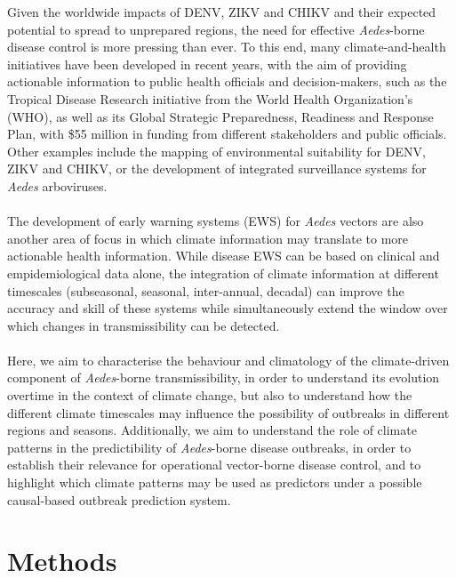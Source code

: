 \documentclass[10pt,twocolumn]{wlscirep}
\begin{document}
Given the worldwide impacts of DENV, ZIKV and CHIKV and their expected potential to spread to unprepared regions, the need for effective \textit{Aedes}-borne disease control is more pressing than ever. To this end, many climate-and-health initiatives have been developed in recent years, with the aim of providing actionable information to public health officials and decision-makers, such as the Tropical Disease Research initiative from the World Health Organization's (WHO)\cite{keating_2023, ramirez_2017}, as well as its Global Strategic Preparedness, Readiness and Response Plan, with \$55 million in funding from different stakeholders and public officials. Other examples include the mapping of environmental suitability for DENV, ZIKV and CHIKV\cite{munoz_2020a, guerra_2025}, or the development of integrated surveillance systems for \textit{Aedes} arboviruses\cite{leandro_2024}.
\\
\\
The development of early warning systems (EWS) for \textit{Aedes} vectors are also another area of focus in which climate information may translate to more actionable health information\cite{ropelewski_1985}. While disease EWS can be based on clinical and empidemiological data alone, the integration of climate information at different timescales (subseasonal, seasonal, inter-annual, decadal) can improve the accuracy and skill of these systems while simultaneously extend the window over which changes in transmissibility can be detected\cite{thomson_2006, cox_2007}.
\\
\\
Here, we aim to characterise the behaviour and climatology of the climate-driven component of \textit{Aedes}-borne transmissibility, in order to understand its evolution overtime in the context of climate change, but also to understand how the different climate timescales may influence the possibility of outbreaks in different regions and seasons. Additionally, we aim to understand the role of climate patterns in the predictibility of \textit{Aedes}-borne disease outbreaks, in order to establish their relevance for operational vector-borne disease control, and to highlight which climate patterns may be used as predictors under a possible causal-based outbreak prediction system.

\section{Methods} \label{sec-methods}
\end{document}
